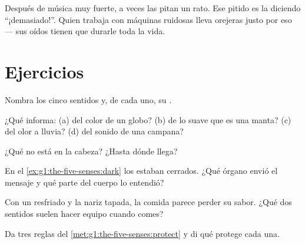 \begin{example}\label{ex:g1:the-five-senses:loud}
Después de música muy fuerte, a veces las  pitan un rato. Ese
pitido es la  diciendo ``¡demasiado!''. Quien trabaja con
máquinas ruidosas lleva orejeras justo por eso --- sus oídos tienen
que durarle toda la vida.
\end{example}

\section{Ejercicios}

\begin{exercise}[$\star$]\label{exo:g1:the-five-senses:1}
Nombra los cinco sentidos y, de cada uno, su .
\end{exercise}

\begin{exercise}[$\star$]\label{exo:g1:the-five-senses:2}
¿Qué  informa: (a) del color de un globo? (b) de
lo suave que es una manta? (c) del olor a lluvia? (d) del sonido de
una campana?
\end{exercise}

\begin{exercise}[$\star$]\label{exo:g1:the-five-senses:3}
¿Qué  no está en la cabeza? ¿Hasta dónde llega?
\end{exercise}

\begin{exercise}[$\star$]\label{exo:g1:the-five-senses:4}
En el \cref{ex:g1:the-five-senses:dark} los  estaban cerrados.
¿Qué órgano envió el mensaje y qué parte del cuerpo lo entendió?
\end{exercise}

\begin{exercise}[$\star$]\label{exo:g1:the-five-senses:5}
Con un resfriado y la nariz tapada, la comida parece perder su sabor.
¿Qué dos sentidos suelen hacer equipo cuando comes?
\end{exercise}

\begin{exercise}[$\star$]\label{exo:g1:the-five-senses:6}
Da tres reglas del \cref{met:g1:the-five-senses:protect} y di qué
 protege cada una.
\end{exercise}

